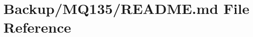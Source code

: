 \hypertarget{_backup_2_m_q135_2_r_e_a_d_m_e_8md}{}\section{Backup/\+M\+Q135/\+R\+E\+A\+D\+ME.md File Reference}
\label{_backup_2_m_q135_2_r_e_a_d_m_e_8md}
